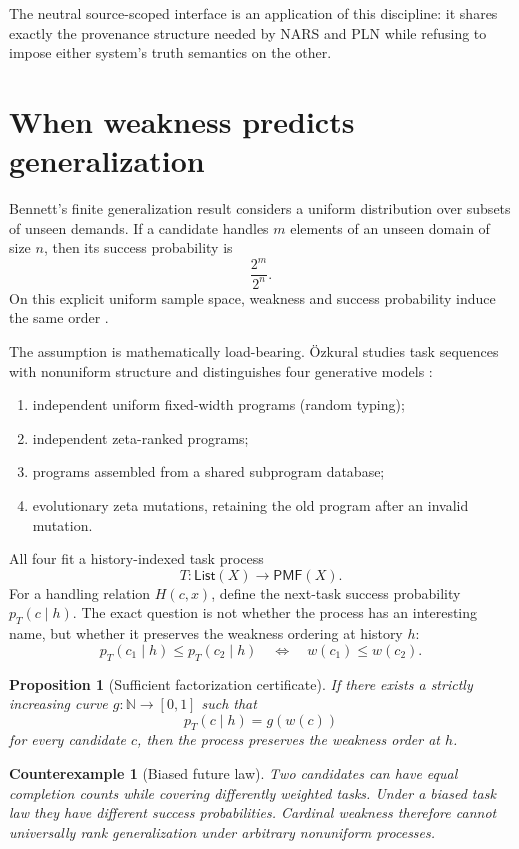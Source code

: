 \documentclass[11pt]{article}
\newtheorem{proposition}[definition]{Proposition}
\newtheorem{counterexample}[definition]{Counterexample}
\theoremstyle{remark}
\begin{document}
The neutral source-scoped interface is an application of this discipline: it
shares exactly the provenance structure needed by NARS and PLN while refusing
to impose either system's truth semantics on the other.

\section{When weakness predicts generalization}

Bennett's finite generalization result considers a uniform distribution over
subsets of unseen demands.  If a candidate handles $m$ elements of an unseen
domain of size $n$, then its success probability is
\[
  \frac{2^m}{2^n}.
\]
On this explicit uniform sample space, weakness and success probability induce
the same order \cite{bennett2023}.

The assumption is mathematically load-bearing.  \"Ozkural studies task
sequences with nonuniform structure and distinguishes four generative models
\cite{ozkuralzeta}:
\begin{enumerate}
  \item independent uniform fixed-width programs (random typing);
  \item independent zeta-ranked programs;
  \item programs assembled from a shared subprogram database;
  \item evolutionary zeta mutations, retaining the old program after an
        invalid mutation.
\end{enumerate}

All four fit a history-indexed task process
\[
  T : \mathsf{List}(X)\longrightarrow \mathsf{PMF}(X).
\]
For a handling relation $H(c,x)$, define the next-task success probability
$p_T(c\mid h)$.  The exact question is not whether the process has an
interesting name, but whether it preserves the weakness ordering at history
$h$:
\[
  p_T(c_1\mid h)\le p_T(c_2\mid h)
  \quad\Longleftrightarrow\quad
  w(c_1)\le w(c_2).
\]

\begin{proposition}[Sufficient factorization certificate]
If there exists a strictly increasing curve $g:\mathbb N\to[0,1]$ such that
\[
  p_T(c\mid h)=g(w(c))
\]
for every candidate $c$, then the process preserves the weakness order at
$h$.
\end{proposition}

\begin{counterexample}[Biased future law]
Two candidates can have equal completion counts while covering differently
weighted tasks.  Under a biased task law they have different success
probabilities.  Cardinal weakness therefore cannot universally rank
generalization under arbitrary nonuniform processes.
\end{counterexample}
\end{document}
